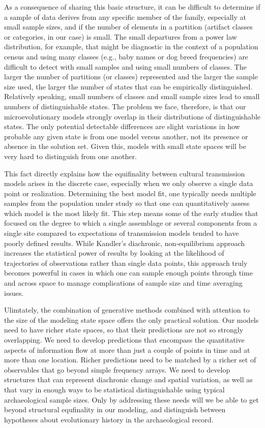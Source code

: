 As a consequence of sharing this basic structure, it can be difficult to determine if a sample of data derives from any specific member of the family, especially at small sample sizes, and if the number of elements in a partition (artifact classes or categories, in our case) is small.  The small departures from a power law distribution, for example, that might be diagnostic in the context of a population census and using many classes (e.g., baby names or dog breed frequencies) are difficult to detect with small samples and using small numbers of classes. The larger the number of partitions (or classes) represented and the larger the sample size used, the larger the number of states that can be empirically distinguished. Relatively speaking, small numbers of classes and small sample sizes lead to small numbers of distinguishable states. The problem we face, therefore, is that our microevolutionary models strongly overlap in their distributions of distinguishable states. The only potential detectable differences are slight variations in how probable any given state is from one model versus another, not its presence or absence in the solution set.  Given this, models with small state spaces will be very hard to distinguish from one another.  

This fact directly explains how the equifinality between cultural transmission models arises in the discrete case, especially when we only observe a single data point or realization.  Determining the best model fit, one typically needs multiple samples from the population under study so that one can quantitatively assess which model is the most likely fit. This step means some of the early studies that focused on the degree to which a single assemblage or several components from a single site compared to expectations of transmission models tended to have poorly defined results. While Kandler's \citeyearpar{Kandler2013} diachronic, non-equilibrium approach increases the statistical power of results by looking at the likelihood of trajectories of observations rather than single data points, this approach truly becomes powerful in cases in which one can sample enough points through time and across space to manage complications of sample size and time averaging issues. 

Ulimtately, the combination of generative methods combined with attention to the size of the modeling state space  offers the only practical solution. Our models need to have richer state spaces, so that their predictions are not so strongly overlapping.  We need to develop predictions that encompass the quantitative aspects of information flow at more than just a couple of points in time and at more than one location. Richer predictions need to be matched by a richer set of observables that go beyond simple frequency arrays.  We need to develop structures that can represent diachronic change and spatial variation, as well as that vary in enough ways to be statistical distinguishable using typical archaeological sample sizes. Only by addressing these needs will we be able to get beyond structural equfinality in our modeling, and distinguish between hypotheses about evolutionary history in the archaeological record.

